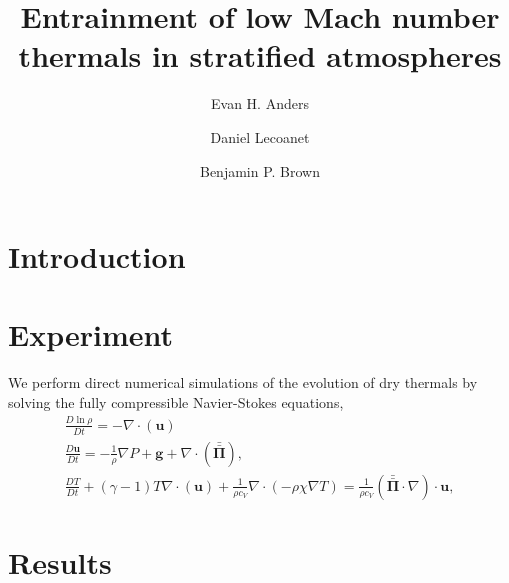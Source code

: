 \documentclass[twocolumn, amsmath, amsfonts, amssymb, trackchanges]{aastex62}
\newcommand{\Div}[1]{\ensuremath{\nabla\cdot\left( #1\right)}}
\newcommand{\grad}{\ensuremath{\nabla}}
\newcommand{\stressT}{\ensuremath{\bm{\bar{\bar{\Pi}}}}}
\begin{document}
\title{Entrainment of low Mach number thermals in stratified atmospheres}


\author[0000-0002-3433-4733]{Evan H. Anders}
\author[0000-0002-7635-9728]{Daniel Lecoanet}
\author[0000-0001-8935-219X]{Benjamin P. Brown}


\begin{abstract}
\end{abstract}


\section{Introduction}
\label{sec:intro}

\section{Experiment} 
\label{sec:experiment}

We perform direct numerical simulations of the evolution of dry thermals
by solving the fully compressible Navier-Stokes equations,
\begin{gather}
\frac{D \ln\rho}{Dt} = -\Div{\bm{u}}
	\label{eqn:continuity}
\\
\frac{D \bm{u}}{D t} =
-\frac{1}{\rho}\grad P + \bm{g} + \Div{\stressT}, 
	\label{eqn:dim_bouss_momentum}
\\
\frac{D T}{D t} + (\gamma - 1)T\Div{\bm{u}} + \frac{1}{\rho c_V}\Div{-\rho\chi\grad T} = 
\frac{1}{\rho c_V}(\stressT \cdot \grad)\cdot \bm{u},
	\label{eqn:dim_bouss_energy}
\end{gather}



\section{Results}
\label{sec:results}
\end{document}
